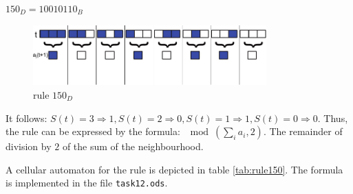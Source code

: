 \documentclass[10pt,a4paper,boxed]{hmcpset}
\begin{document}
\begin{problem}[Assignment 12]
\end{problem}
\begin{solution}
${150}_D = {10010110}_B$
\begin{figure}[h!]
	\centering
	\includegraphics[width=0.8\textwidth]{img/task12}
	\caption{rule ${150}_D$}
\end{figure}

It follows: $S(t)=3 \Rightarrow 1, S(t)=2 \Rightarrow 0, S(t)=1 \Rightarrow 1, S(t)=0 \Rightarrow 0$.
Thus, the rule can be expressed by the formula: $\mod{(\sum_i a_i, 2)}$. The remainder of division by $2$ of the sum of the neighbourhood.

A cellular automaton for the rule is depicted in table \ref{tab:rule150}. The formula is implemented in the file \verb+task12.ods+. 


\end{solution}
\end{document}
